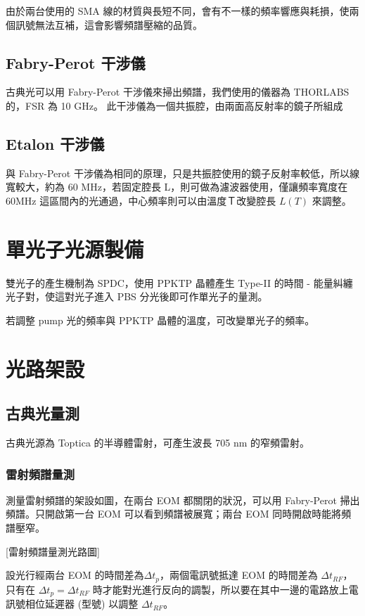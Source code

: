 \documentclass[class=NCU_thesis, crop=false]{standalone}
\begin{document}
由於兩台使用的 SMA 線的材質與長短不同，會有不一樣的頻率響應與耗損，使兩個訊號無法互補，這會影響頻譜壓縮的品質。

\subsection{Fabry-Perot 干涉儀}
古典光可以用 Fabry-Perot 干涉儀來掃出頻譜，我們使用的儀器為 THORLABS 的，FSR 為 10 GHz。
此干涉儀為一個共振腔，由兩面高反射率的鏡子所組成

\subsection{Etalon 干涉儀}
與 Fabry-Perot 干涉儀為相同的原理，只是共振腔使用的鏡子反射率較低，所以線寬較大，約為 60 MHz，若固定腔長 L，則可做為濾波器使用，僅讓頻率寬度在 60MHz 這區間內的光通過，中心頻率則可以由溫度Ｔ改變腔長 $L(T)$ 來調整。

\section{單光子光源製備}
雙光子的產生機制為 SPDC，使用 PPKTP 晶體產生 Type-II 的時間 - 能量糾纏光子對，使這對光子進入 PBS 分光後即可作單光子的量測。

若調整 pump 光的頻率與 PPKTP 晶體的溫度，可改變單光子的頻率。

\section{光路架設}
\subsection{古典光量測}
古典光源為 Toptica 的半導體雷射，可產生波長 705 nm 的窄頻雷射。

\subsubsection{雷射頻譜量測}
測量雷射頻譜的架設如圖，在兩台 EOM 都關閉的狀況，可以用 Fabry-Perot 掃出頻譜。只開啟第一台 EOM 可以看到頻譜被展寬；兩台 EOM 同時開啟時能將頻譜壓窄。

[雷射頻譜量測光路圖]

設光行經兩台 EOM 的時間差為$\Delta t_{p}$，兩個電訊號抵達 EOM 的時間差為 $\Delta t_{RF}$，只有在 $\Delta t_{p}=\Delta t_{RF}$ 時才能對光進行反向的調製，所以要在其中一邊的電路放上電訊號相位延遲器 (型號) 以調整 $\Delta t_{RF}$。
\end{document}
